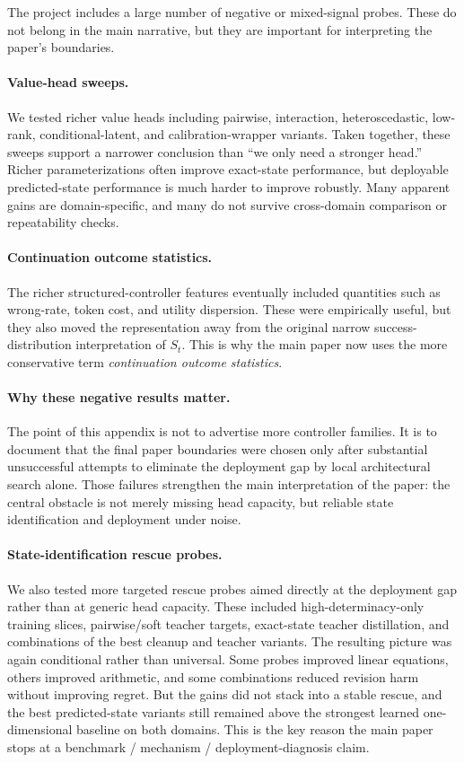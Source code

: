 The project includes a large number of negative or mixed-signal probes.
These do not belong in the main narrative, but they are important for interpreting the paper's boundaries.

\paragraph{Value-head sweeps.}
We tested richer value heads including pairwise, interaction, heteroscedastic, low-rank, conditional-latent, and calibration-wrapper variants.
Taken together, these sweeps support a narrower conclusion than ``we only need a stronger head.''
Richer parameterizations often improve exact-state performance, but deployable predicted-state performance is much harder to improve robustly.
Many apparent gains are domain-specific, and many do not survive cross-domain comparison or repeatability checks.

\paragraph{Continuation outcome statistics.}
The richer structured-controller features eventually included quantities such as wrong-rate, token cost, and utility dispersion.
These were empirically useful, but they also moved the representation away from the original narrow success-distribution interpretation of \(S_t\).
This is why the main paper now uses the more conservative term \emph{continuation outcome statistics}.

\paragraph{Why these negative results matter.}
The point of this appendix is not to advertise more controller families.
It is to document that the final paper boundaries were chosen only after substantial unsuccessful attempts to eliminate the deployment gap by local architectural search alone.
Those failures strengthen the main interpretation of the paper:
the central obstacle is not merely missing head capacity, but reliable state identification and deployment under noise.

\paragraph{State-identification rescue probes.}
We also tested more targeted rescue probes aimed directly at the deployment gap rather than at generic head capacity.
These included high-determinacy-only training slices, pairwise/soft teacher targets, exact-state teacher distillation, and combinations of the best cleanup and teacher variants.
The resulting picture was again conditional rather than universal.
Some probes improved linear equations, others improved arithmetic, and some combinations reduced revision harm without improving regret.
But the gains did not stack into a stable rescue, and the best predicted-state variants still remained above the strongest learned one-dimensional baseline on both domains.
This is the key reason the main paper stops at a benchmark / mechanism / deployment-diagnosis claim.
